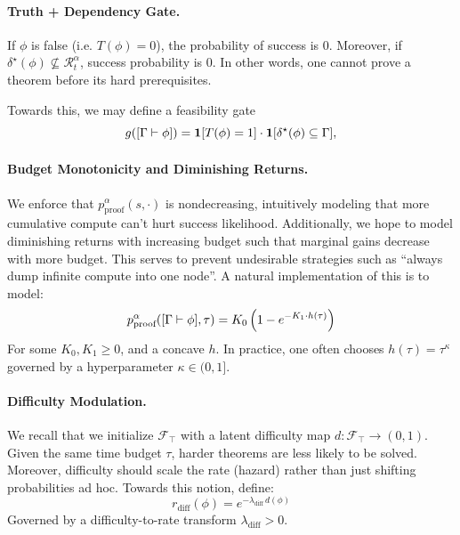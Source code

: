 \paragraph{Truth + Dependency Gate.} If $\phi$ is false (i.e. $T(\phi)=0$), the probability of success is $0$. Moreover, if $\delta^\star(\phi)\not\subseteq \mathcal{R}_t^\alpha$, success probability is 0. In other words, one cannot prove a theorem before its hard prerequisites.

Towards this, we may define a feasibility gate
\[
g([\Gamma\vdash \phi])=\mathbf{1}[T(\phi)=1]\cdot \mathbf{1}[\delta^\star(\phi)\subseteq \Gamma],
\]

\paragraph{Budget Monotonicity and Diminishing Returns.} We enforce that $p^\alpha_{\mathrm{proof}}(s,\cdot)$ is nondecreasing, intuitively modeling that more cumulative compute can’t hurt success likelihood. Additionally, we hope to model diminishing returns with increasing budget such that marginal gains decrease with more budget. This serves to prevent undesirable strategies such as ``always dump infinite compute into one node''. A natural implementation of this is to model:
\[
p_{\text{proof}}^\alpha([\Gamma \vdash \phi],\tau)=K_0\left(1-e^{-K_1\cdot h(\tau)}\right)
\]
For some $K_0,K_1\ge 0$, and a concave $h$. In practice, one often chooses $h(\tau) = \tau^\kappa$ governed by a hyperparameter $\kappa \in (0,1]$.

\paragraph{Difficulty Modulation.} We recall that we initialize $\mathcal{F}_\top$ with a latent difficulty map $d: \mathcal{F}_\top \to (0,1)$. Given the same time budget $\tau$, harder theorems are less likely to be solved. Moreover, difficulty should scale the rate (hazard) rather than just shifting probabilities ad hoc. Towards this notion, define:
\[
r_{\mathrm{diff}}(\phi)=e^{-\lambda_{\mathrm{diff}}\,d(\phi)}
\]
Governed by a difficulty-to-rate transform $\lambda_{\mathrm{diff}}>0$.

